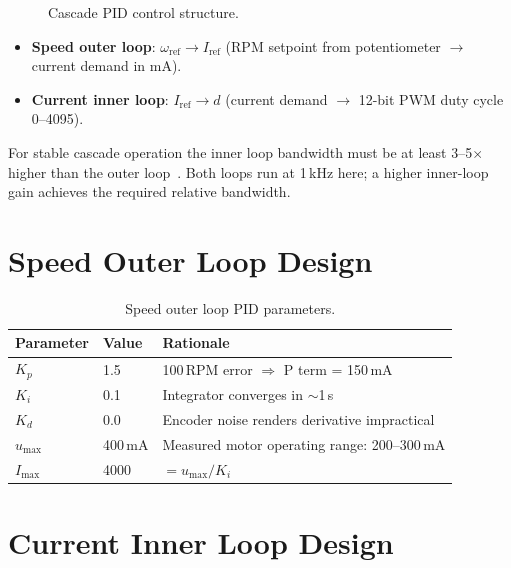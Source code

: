 \documentclass[12pt, a4paper]{report}
\begin{document}
\begin{figure}[H]
    \centering
    \caption{Cascade PID control structure.}
    \label{fig:cascade}
\end{figure}

\begin{itemize}
    \item \textbf{Speed outer loop}: $\omega_{\text{ref}} \to I_{\text{ref}}$
    (RPM setpoint from potentiometer $\to$ current demand in mA).
    \item \textbf{Current inner loop}: $I_{\text{ref}} \to d$
    (current demand $\to$ 12-bit PWM duty cycle 0--4095).
\end{itemize}

For stable cascade operation the inner loop bandwidth must be at least
3--5$\times$ higher than the outer loop~\cite{astrom2006}. Both loops run
at 1\,kHz here; a higher inner-loop gain achieves the required relative
bandwidth.

\section{Speed Outer Loop Design}

\begin{table}[H]
    \centering
    \caption{Speed outer loop PID parameters.}
    \label{tab:speed_pid}
    \begin{tabular}{lll}
        \toprule
        \textbf{Parameter} & \textbf{Value} & \textbf{Rationale} \\
        \midrule
        $K_p$ & 1.5  & 100\,RPM error $\Rightarrow$ P term = 150\,mA \\
        $K_i$ & 0.1  & Integrator converges in $\sim$1\,s \\
        $K_d$ & 0.0  & Encoder noise renders derivative impractical \\
        $u_{\max}$ & 400\,mA & Measured motor operating range: 200--300\,mA \\
        $I_{\max}$ & 4000    & $= u_{\max}/K_i$ \\
        \bottomrule
    \end{tabular}
\end{table}

\section{Current Inner Loop Design}
\end{document}
